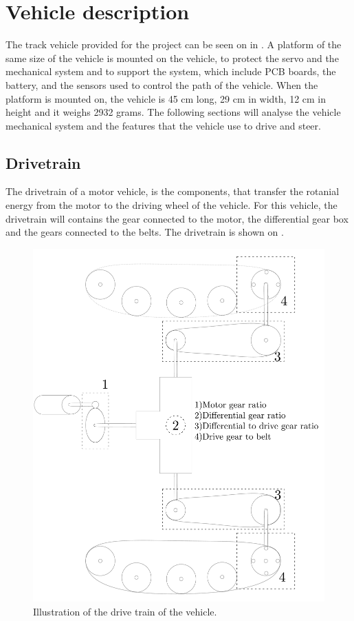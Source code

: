 \section{Vehicle description}
The track vehicle provided for the project can be seen on  in . A platform of the same size of the vehicle  is mounted on the vehicle, to protect the servo and the mechanical system and to support the system, which include PCB boards, the battery, and the sensors used to control the path of the vehicle. When the platform is mounted on, the vehicle is 45 cm long, 29 cm in width, 12 cm in height and it weighs 2932 grams.
The following sections will analyse the vehicle mechanical system and the features that the vehicle use to drive and steer.

\subsection{Drivetrain}

The drivetrain of a motor vehicle, is the components, that transfer the rotanial energy from the motor to the driving wheel of the vehicle. For this vehicle, the drivetrain will contains the gear connected to the motor, the differential gear box and the gears connected to the belts. The drivetrain is shown on .

\begin{figure}[H]
	\centering
	\includegraphics[scale=0.2]{figures/vehicleDescriptionDriveTrain.pdf}
	\caption{Illustration of the drive train of the vehicle.}
	\label{vehicleDescriptionDriveTrain}
\end{figure}

